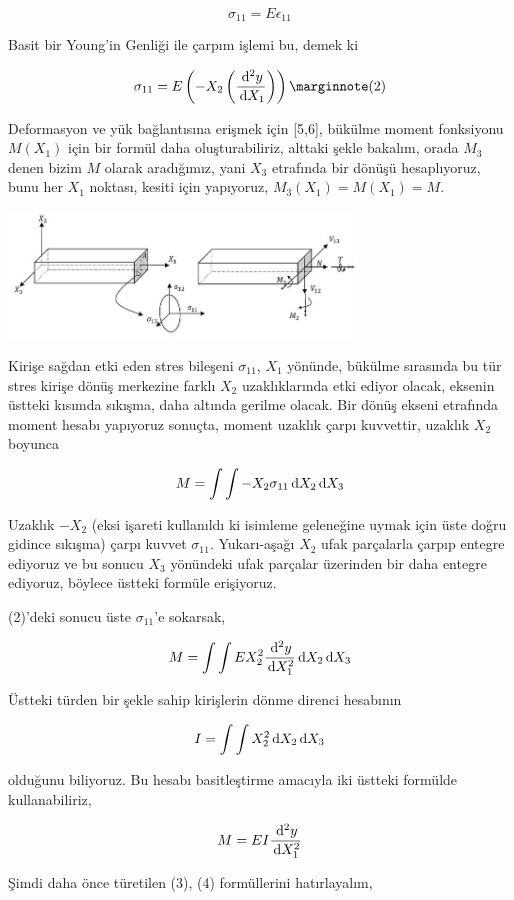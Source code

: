 \documentclass[12pt,fleqn]{article}\usepackage{../../common}
\begin{document}
$$
\sigma_{11} = E \epsilon_{11}
$$

Basit bir Young'in Genliği ile çarpım işlemi bu, demek ki

$$
\sigma_{11} = E \left( -X_2 \left( \dfrac{\ud^2 y}{\ud X_1} \right) \right)
\mlabel{2}
$$

Deformasyon ve yük bağlantısına erişmek için [5,6], bükülme moment fonksiyonu
$M(X_1)$ için bir formül daha oluşturabiliriz, alttaki şekle bakalım, orada
$M_3$ denen bizim $M$ olarak aradığımız, yani $X_3$ etrafında bir dönüşü
hesaplıyoruz, bunu her $X_1$ noktası, kesiti için yapıyoruz, $M_3(X_1) = M(X_1)
= M$.

\includegraphics[width=25em]{phy_020_strs_02_15.jpg}

Kirişe sağdan etki eden stres bileşeni $\sigma_{11}$, $X_1$ yönünde, bükülme
sırasında bu tür stres kirişe dönüş merkezine farklı $X_2$ uzaklıklarında etki
ediyor olacak, eksenin üstteki kısımda sıkışma, daha altında gerilme olacak. Bir
dönüş ekseni etrafında moment hesabı yapıyoruz sonuçta, moment uzaklık çarpı
kuvvettir, uzaklık $X_2$ boyunca

$$
M = \int \int -X_2 \sigma_{11} \,\mathrm{d} X_2 \,\mathrm{d} X_3
$$

Uzaklık $-X_2$ (eksi işareti kullanıldı ki isimleme geleneğine uymak için üste
doğru gidince sıkışma) çarpı kuvvet $\sigma_{11}$. Yukarı-aşağı $X_2$ ufak
parçalarla çarpıp entegre ediyoruz ve bu sonucu $X_3$ yönündeki ufak parçalar
üzerinden bir daha entegre ediyoruz, böylece üstteki formüle erişiyoruz.

(2)'deki sonucu üste $\sigma_{11}$'e sokarsak,

$$
M = \int \int E X_2^2 \frac{\,\mathrm{d}^2 y}{\,\mathrm{d} X_1^2} \,\mathrm{d} X_2 \,\mathrm{d} X_3
$$

Üstteki türden bir şekle sahip kirişlerin dönme direnci hesabının

$$
I = \int \int X_2^2 \,\mathrm{d} X_2 \,\mathrm{d} X_3
$$

olduğunu biliyoruz. Bu hesabı basitleştirme amacıyla iki üstteki formülde
kullanabiliriz,

$$
M = E I \frac{\,\mathrm{d}^2 y}{\,\mathrm{d} X_1^2} 
$$

Şimdi daha önce türetilen (3), (4) formüllerini hatırlayalım,
\end{document}

